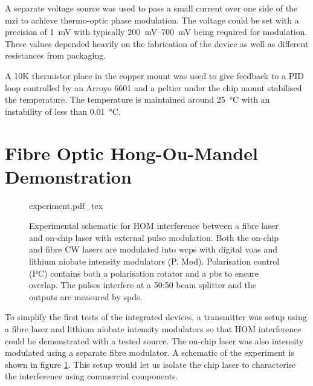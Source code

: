 A separate voltage source was used to pass a small current over one side of the \ac{mzi} to achieve thermo-optic phase modulation. The voltage could be set with a precision of \SI{1}{\mV} with typically \SIrange{200}{700}{\mV} being required for modulation. These values depended heavily on the fabrication of the device as well as different resistances from packaging.

A 10K thermistor place in the copper mount was used to give feedback to a PID loop controlled by an Arroyo 6601 and a peltier under the chip mount stabilised the temperature. The temperature is maintained around \SI{25}{\celsius} with an instability of less than \SI{0.01}{\celsius}. 

\section{Fibre Optic Hong-Ou-Mandel Demonstration}

\begin{figure}[tp]
	\centering
	\def\svgwidth{\textwidth} 
	{experiment.pdf_tex}
	\caption[Fibre-chip HOM experimental setup]{Experimental schematic for \ac{HOM} interference between a fibre laser and on-chip laser with external pulse modulation. Both the on-chip and fibre \ac{CW} lasers are modulated into \acp{wcp} with digital \acp{voa} and lithium niobate intensity modulators (P. Mod). Polarisation control (PC) contains both a polarisation rotator and a \ac{pbs} to ensure overlap. The pulses interfere at a {50:50} beam splitter and the outputs are measured by \acp{spd}.}
	\label{fig:fibre_chip_exp}
\end{figure}

To simplify the first tests of the integrated devices, a transmitter was setup using a fibre laser and lithium niobate intensity modulators so that \ac{HOM} interference could be demonstrated with a tested source. The on-chip laser was also intensity modulated using a separate fibre modulator. A schematic of the experiment is shown in figure \ref{fig:fibre_chip_exp}. This setup would let us isolate the chip laser to characterise the interference using commercial components.



